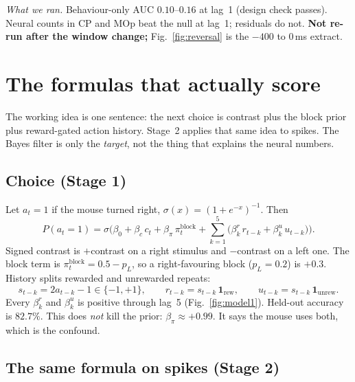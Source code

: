 \documentclass[11pt,a4paper]{article}
\begin{document}
\textit{What we ran.} Behaviour-only AUC $0.10$--$0.16$ at lag~1 (design
check passes). Neural counts in CP and MOp beat the null at lag~1; residuals
do not. \textbf{Not re-run after the window change;} Fig.~\ref{fig:reversal}
is the $-400$ to $0$\,ms extract.

\section{The formulas that actually score}

The working idea is one sentence: the next choice is contrast plus the block
prior plus reward-gated action history. Stage~2 applies that same idea to
spikes. The Bayes filter is only the \emph{target}, not the thing that
explains the neural numbers.

\subsection{Choice (Stage 1)}

Let $a_t=1$ if the mouse turned right, $\sigma(x)=(1+e^{-x})^{-1}$. Then
\begin{equation}
P(a_t=1)
=
\sigma\!\Big(
\beta_0
+ \beta_c\,c_t
+ \beta_\pi\,\pi^{\mathrm{block}}_t
+ \sum_{k=1}^{5}
  \big(\beta_k^{r}\,r_{t-k}+\beta_k^{u}\,u_{t-k}\big)
\Big).
\end{equation}
Signed contrast is \(+\)contrast on a right stimulus and \(-\)contrast on a
left one. The block term is \(\pi^{\mathrm{block}}_t=0.5-p_L\), so a
right-favouring block (\(p_L=0.2\)) is \(+0.3\). History splits rewarded and
unrewarded repeats:
\begin{equation}
s_{t-k}=2a_{t-k}-1\in\{-1,+1\},\qquad
r_{t-k}=s_{t-k}\,\mathbf{1}_{\mathrm{rew}},\qquad
u_{t-k}=s_{t-k}\,\mathbf{1}_{\mathrm{unrew}}.
\end{equation}
Every \(\beta_k^{r}\) and \(\beta_k^{u}\) is positive through lag~5
(Fig.~\ref{fig:model1}). Held-out accuracy is \(82.7\%\). This does
\emph{not} kill the prior: \(\beta_\pi\approx +0.99\). It says the mouse
uses both, which is the confound.

\subsection{The same formula on spikes (Stage 2)}
\end{document}
